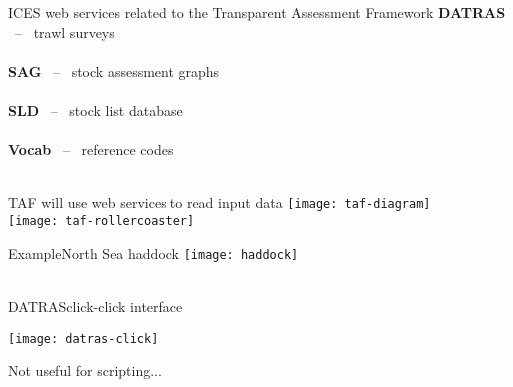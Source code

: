 \documentclass[aspectratio=169]{beamer}
\begin{document}

\begin{frame}{ICES web services}
  {related to the Transparent Assessment Framework}\small
  {\bf DATRAS} {\footnotesize\gray ~--~ trawl surveys}\\
  \\[4ex]
  {\bf SAG} {\footnotesize\gray ~--~ stock assessment graphs}\\
  \\[4ex]
  {\bf SLD} {\footnotesize\gray ~--~ stock list database}\\
  \\[4ex]
  {\bf Vocab} {\footnotesize\gray ~--~ reference codes}\\
  \\[3ex]
\end{frame}


\begin{frame}{TAF will use web services}{$\:$to read input data}
  \vspace{-3ex}\centering
  \onslide<+->
  \texttt{[image: taf-diagram]}\\[-27.5ex]
  \onslide<+->
  \hspace{-14ex}\texttt{[image: taf-rollercoaster]}
\end{frame}


\begin{frame}{Example}{North Sea haddock}
  \centering\texttt{[image: haddock]}\\[-13ex]
  \hspace{40ex}{\footnotesize\green yay, data!}\\[13ex]
\end{frame}


\begin{frame}{DATRAS}{click-click interface}
  \vspace{-4ex}
  \begin{center}
    \texttt{[image: datras-click]}
  \end{center}
  \vspace{-7ex}
  \quad\small\orange Not useful for scripting...\\[4ex]
\end{frame}
\end{document}
